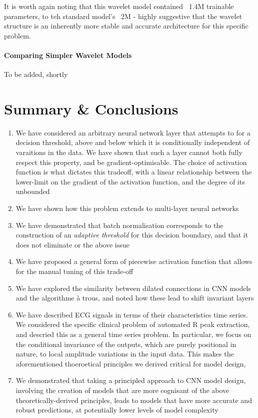 \documentclass[9pt,conference]{IEEEtran}
\begin{document}
It is worth again noting that this wavelet model contained ~1.4M trainable parameters, to teh standard model's ~2M - highly suggestive that the wavelet structure is an inherently more stable and accurate architecture for this specific problem.

\paragraph{\textbf{Comparing Simpler Wavelet Models}}
To be added, shortly


\section{Summary \& Conclusions}

\begin{enumerate}
    \item We have considered an arbitrary neural network layer that attempts to for a decision threshold, above and below which it is conditionally independent of varaitions in the data. We have shown that such a layer cannot both fully respect this property, and be gradient-optimisable. The choice of activation function is what dictates this tradeoff, with a linear relationship between the lower-limit on the gradient of the activation function, and the degree of its unbounded
    \item We have shown how this problem extends to multi-layer neural networks
    \item We have demonstrated that batch normalisation corresponds to the construction of an \textit{adaptive threshold} for this decision boundary, and that it does not eliminate or the above issue
    \item We have proposed a general form of piecewise activation function that allows for the manual tuning of this trade-off
    \item We have explored the similarity between dilated connections in CNN models and the algorithme à trous, and noted how these lead to shift invariant layers
    \item We have described ECG signals in terms of their characteristics time series. We considered the specific clinical problem of automated R peak extraction, and descried this as a general time series problem. In particular, we focus on the conditional invariance of the outputs, which are purely positional in nature, to local amplitude variations in the input data. This makes the aforementioned thoeroetical principles we derived critical for model design,
    \item We demonstrated that taking a principled approach to CNN model design, involving the creation of models that are more cognisant of the above theoretically-derived principles, leads to models that have more accurate and robust predictions, at potentially lower levels of model complexity
\end{enumerate}
\end{document}
